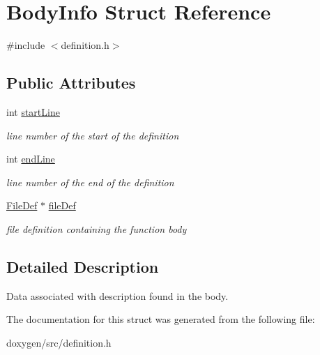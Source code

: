 \hypertarget{struct_body_info}{}\section{Body\+Info Struct Reference}
\label{struct_body_info}


{\ttfamily \#include $<$definition.\+h$>$}

\subsection*{Public Attributes}
\begin{DoxyCompactItemize}
\item 
\mbox{\label{struct_body_info_a13ecf2183dee65bdf06cda72cd0363a0}} 
int \mbox{\hyperlink{struct_body_info_a13ecf2183dee65bdf06cda72cd0363a0}{start\+Line}}
\begin{DoxyCompactList}\small\item\em line number of the start of the definition \end{DoxyCompactList}\item 
\mbox{\label{struct_body_info_adf40ab79b5fe12c0e46fcd272a62cf44}} 
int \mbox{\hyperlink{struct_body_info_adf40ab79b5fe12c0e46fcd272a62cf44}{end\+Line}}
\begin{DoxyCompactList}\small\item\em line number of the end of the definition \end{DoxyCompactList}\item 
\mbox{\label{struct_body_info_a0a09e75f0c6dbd45673103dccc125172}} 
\mbox{\hyperlink{class_file_def}{File\+Def}} $\ast$ \mbox{\hyperlink{struct_body_info_a0a09e75f0c6dbd45673103dccc125172}{file\+Def}}
\begin{DoxyCompactList}\small\item\em file definition containing the function body \end{DoxyCompactList}\end{DoxyCompactItemize}


\subsection{Detailed Description}
Data associated with description found in the body. 

The documentation for this struct was generated from the following file\+:\begin{DoxyCompactItemize}
\item 
doxygen/src/definition.\+h\end{DoxyCompactItemize}
